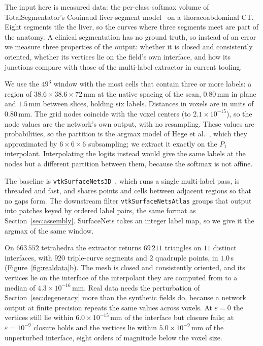\documentclass{egpubl}
\theoremstyle{definition}
\begin{document}
The input here is measured data: the per-class softmax volume of
TotalSegmentator's Couinaud liver-segment model~\cite{wasserthal2023} on a
thoracoabdominal CT. Eight segments tile the liver, so the curves where three
segments meet are part of the anatomy. A clinical segmentation has no ground
truth, so instead of an error we measure three properties of the output:
whether it is closed and consistently oriented, whether its vertices lie on
the field's own interface, and how its junctions compare with those of the
multi-label extractor in current tooling.

We use the $49^3$ window with the most cells that contain three
or more labels: a region of $38.6 \times 38.6 \times 72$\,mm at the native
spacing of the scan, $0.80$\,mm in plane and $1.5$\,mm between slices,
holding six labels. Distances in voxels are in units of $0.80$\,mm. The grid nodes coincide with the
voxel centers (to $2.1\times10^{-15}$), so the node values are the network's
own output, with no resampling. These values are probabilities, so the
partition is the argmax model of Hege et al.~\cite{hege1997}, which they
approximated by $6\times6\times6$ subsampling; we extract it exactly on the
$P_1$ interpolant. Interpolating the logits instead would give the same labels
at the nodes but a different partition between them, because the softmax is
not affine.

The baseline is \texttt{vtkSurfaceNets3D}~\cite{frisken2022, vtk}, which runs
a single multi-label pass, is threaded and fast, and shares points and cells
between adjacent regions so that no gaps form. The downstream filter
\texttt{vtkSurfaceNetsAtlas} groups that output into patches keyed by ordered
label pairs, the same format as Section~\ref{sec:assembly}. SurfaceNets takes
an integer label map, so we give it the argmax of the same window.

On $663\,552$ tetrahedra the extractor returns $69\,211$
triangles on $11$ distinct interfaces, with $920$ triple-curve segments and $2$
quadruple points, in $1.0$\,s (Figure~\ref{fig:realdata}b). The mesh is
closed and consistently oriented, and its vertices lie on the interface of
the interpolant they are computed from to a median of
$4.3\times10^{-16}$\,mm. Real data needs the perturbation of
Section~\ref{sec:degeneracy} more than the synthetic fields do, because a
network output at finite precision repeats the same values across voxels. At
$\varepsilon = 0$ the vertices still lie within $6.0\times10^{-15}$\,mm of the
interface but closure fails; at $\varepsilon = 10^{-9}$ closure holds and the
vertices lie within $5.0\times10^{-9}$\,mm of the unperturbed interface, eight
orders of magnitude below the voxel size.
\end{document}
